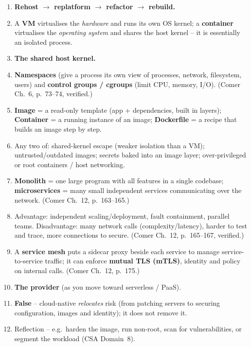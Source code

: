 \documentclass[11pt]{article}
\begin{document}
\begin{enumerate}
\item \textbf{Rehost $\rightarrow$ replatform $\rightarrow$ refactor $\rightarrow$ rebuild.}
\item A \textbf{VM} virtualises the \emph{hardware} and runs its own OS kernel; a \textbf{container}
      virtualises the \emph{operating system} and shares the host kernel -- it is essentially an
      isolated process.
\item \textbf{The shared host kernel.}
\item \textbf{Namespaces} (give a process its own view of processes, network, filesystem, users) and
      \textbf{control groups / cgroups} (limit CPU, memory, I/O). (Comer Ch.~6, p.~73--74, verified.)
\item \textbf{Image} = a read-only template (app + dependencies, built in layers); \textbf{Container} =
      a running instance of an image; \textbf{Dockerfile} = a recipe that builds an image step by step.
\item Any two of: shared-kernel escape (weaker isolation than a VM); untrusted/outdated images;
      secrets baked into an image layer; over-privileged or root containers / host networking.
\item \textbf{Monolith} = one large program with all features in a single codebase; \textbf{microservices}
      = many small independent services communicating over the network. (Comer Ch.~12, p.~163--165.)
\item Advantage: independent scaling/deployment, fault containment, parallel teams. Disadvantage: many
      network calls (complexity/latency), harder to test and trace, more connections to secure. (Comer
      Ch.~12, p.~165--167, verified.)
\item A \textbf{service mesh} puts a sidecar proxy beside each service to manage service-to-service
      traffic; it can enforce \textbf{mutual TLS (mTLS)}, identity and policy on internal calls. (Comer
      Ch.~12, p.~175.)
\item \textbf{The provider} (as you move toward serverless / PaaS).
\item \textbf{False} -- cloud-native \emph{relocates} risk (from patching servers to securing
      configuration, images and identity); it does not remove it.
\item Reflection -- e.g.\ harden the image, run non-root, scan for vulnerabilities, or segment the
      workload (CSA Domain~8).
\end{enumerate}
\end{document}
